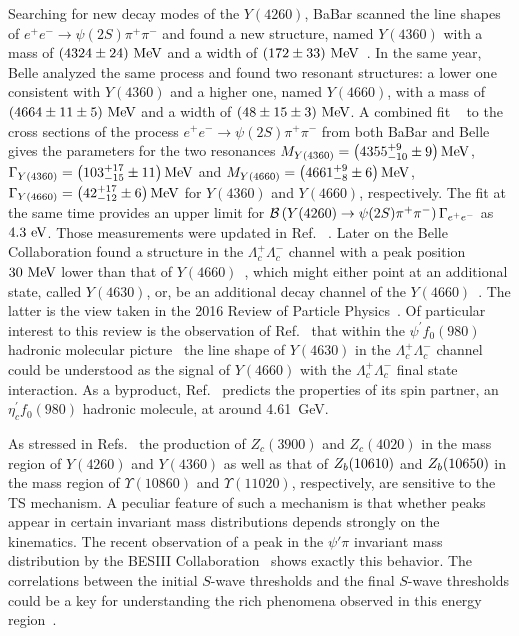 Searching for new decay modes of the $Y(4260)$, BaBar scanned the line shapes of
$e^+e^-\to \psi(2S)\pi^+\pi^-$ and found a new structure, named $Y(4360)$ with a
mass of $(4324\pm 24)~\mathrm{MeV}$ and a width of $(172\pm
33)~\mathrm{MeV}$~\cite{Aubert:2007zz}. In the same year, Belle \cite{Wang:2007ea}
analyzed the same process and found two resonant structures: a lower one
consistent with $Y(4360)$ and a higher one, named $Y(4660)$, with a mass of
$(4664\pm 11\pm 5)~\mathrm{MeV}$ and a width of $(48\pm 15\pm 3)~\mathrm{MeV}$. A combined fit
~\cite{Liu:2008hja} to the cross sections of the process $e^+e^-\to
\psi(2S)\pi^+\pi^-$ from both BaBar and Belle gives the parameters for the two
resonances $M_{Y(4360)}=\left(4355^{+9}_{-10}\pm 9\right)\mathrm{MeV}$,
$\Gamma_{Y(4360)}=\left(103^{+17}_{-15}\pm 11\right)\mathrm{MeV}$ and
$M_{Y(4660)}=\left(4661^{+9}_{-8}\pm6\right)\mathrm{MeV}$,
$\Gamma_{Y(4660)}=\left(42^{+17}_{-12}\pm6\right)\mathrm{MeV}$ for $Y(4360)$ and
$Y(4660)$, respectively. The fit at the same time provides an upper limit for
$\mathcal{B}\left(Y(4260)\to \psi(2S)\pi^+\pi^-\right)\Gamma_{e^+e^-}$ as $4.3~\mathrm{eV}$.
Those measurements were updated in Ref.~ \cite{Wang:2014hta}.
Later on the Belle Collaboration found a structure in the
$\Lambda_c^+\Lambda_c^-$ channel with a peak position $30~\mathrm{MeV}$ lower than that
of $Y(4660)$~\cite{Pakhlova:2008vn}, which might either point at an additional
state, called $Y(4630)$, or, be an additional  decay channel of the
$Y(4660)$~\cite{Cotugno:2009ys,Guo:2010tk}. The latter is the view taken in the
2016 Review of Particle Physics~\cite{Olive:2016xmw}.
Of particular interest to this review is the observation of
Ref.~\cite{Guo:2010tk} that within the $\psi^\prime f_0(980)$ hadronic molecular
picture~\cite{Guo:2008zg,Wang:2009hi} the line shape of $Y(4630)$ in the
$\Lambda_c^+\Lambda_c^-$ channel could be understood as the signal of $Y(4660)$
with the $\Lambda_c^+\Lambda_c^-$ final state interaction.
As a byproduct, Ref.~\cite{Guo:2009id} predicts the properties of its spin
partner, an $\eta_c^\prime f_0(980)$ hadronic molecule, at around 4.61~GeV.


As stressed in Refs.~\cite{Wang:2013hga,Bondar:2016pox} the 
production of $Z_c(3900)$ and $Z_c(4020)$ in the mass region of 
$Y(4260)$ and $Y(4360)$
as well as that of $Z_b(10610)$ and $Z_b(10650)$ in the mass region of $\Upsilon(10860)$ and 
$\Upsilon(11020)$, respectively, are sensitive to the TS mechanism. A peculiar 
feature of such a mechanism is that whether peaks appear in certain invariant 
mass distributions depends strongly on the kinematics. The recent observation 
of a peak in the $\psi'\pi$ invariant mass distribution by the BESIII 
Collaboration~\cite{Ablikim:2017oaf} shows exactly this behavior.
The correlations between the initial $S$-wave thresholds and the final $S$-wave
thresholds could be a key for understanding the rich phenomena observed in this 
energy region~\cite{Liu:2015taa}. 


